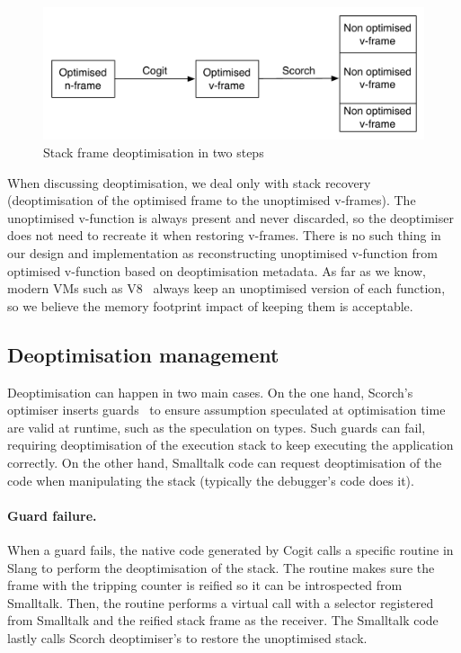 \documentclass[a4paper,12pt,twoside]{../includes/ThesisStyle}
\begin{document}
\begin{figure}[h!]
    \begin{center}
        \includegraphics[width=0.8\linewidth]{SFDeoptimisation}
        \caption{Stack frame deoptimisation in two steps}
        \label{fig:SFDeoptimisation}
    \end{center}
\end{figure}

When discussing deoptimisation, we deal only with stack recovery (deoptimisation of the optimised frame to the unoptimised v-frames). The unoptimised v-function is always present and never discarded, so the deoptimiser does not need to recreate it when restoring v-frames. There is no such thing in our design and implementation as reconstructing unoptimised v-function from optimised v-function based on deoptimisation metadata. As far as we know, modern VMs such as V8~\cite{V8} always keep an unoptimised version of each function, so we believe the memory footprint impact of keeping them is acceptable.

\subsection{Deoptimisation management}

Deoptimisation can happen in two main cases. On the one hand, Scorch's optimiser inserts guards~\cite{Holz92a} to ensure assumption speculated at optimisation time are valid at runtime, such as the speculation on types. Such guards can fail, requiring deoptimisation of the execution stack to keep executing the application correctly. On the other hand, Smalltalk code can request deoptimisation of the code when manipulating the stack (typically the debugger's code does it).

\paragraph{Guard failure.} When a guard fails, the native code generated by Cogit calls a specific routine in Slang to perform the deoptimisation of the stack. The routine makes sure the frame with the tripping counter is reified so it can be introspected from Smalltalk. Then, the routine performs a virtual call with a selector registered from Smalltalk and the reified stack frame as the receiver. The Smalltalk code lastly calls Scorch deoptimiser's to restore the unoptimised stack.
\end{document}
